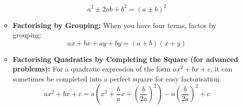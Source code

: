 \begin{itemize}
\begin{itemize}
\begin{equation}
            a^2 \pm 2ab + b^2 = \left(a \pm b\right)^2
        \end{equation}
        \item \textbf{Factorising by Grouping:} When you have four terms, factor by grouping:
        \begin{equation}
            ax + bx + ay + by = \left(a + b\right)\left(x + y\right)
        \end{equation}
        \item \textbf{Factorising Quadratics by Completing the Square (for advanced problems):} For a quadratic expression of the
        form $ax^2 + bx + c$, it can sometimes be completed into a perfect square for easy factorisation.
        \begin{equation}
            ax^2 + bx + c = a \left(x^2 + \frac{b}{a} x + \left(\frac{b}{2a}\right)^2\right) - a \left(\frac{b}{2a}\right)^2 + c
        \end{equation}
    \end{itemize}
\end{itemize}